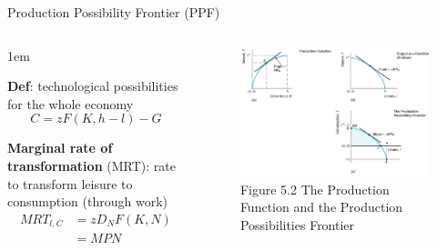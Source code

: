 \documentclass[11pt,aspectratio=43]{beamer}
\let\olditemize=\itemize
\let\endolditemize=\enditemize
\renewenvironment{itemize}{\olditemize \itemsep1em}{\endolditemize}
\theoremstyle{definition}
\begin{document}
\begin{frame}{Production Possibility Frontier (PPF)}
\label{slide:Production_Possibility_Frontier__PPF_}
\begin{columns}
    \begin{column}{0.5\textwidth}
        \begin{itemize}
            \item \textbf{Def}: technological possibilities for the whole economy
            \begin{equation}
            \label{eq:PPF}
                C = z F( K, h-l ) - G
            \end{equation}
            \item \textbf{Marginal rate of transformation} (MRT): rate to transform leisure to consumption (through work)
            \begin{equation}
            \label{eq:MRT}
                \begin{split}
                    MRT_{l, C}
                        & = z D_{N} F( K, N )
                    \\
                        & = MPN
                    \\
                \end{split}
            \end{equation}
        \end{itemize}
    \end{column}
    \begin{column}{0.5\textwidth}
        \begin{figure}
            \caption{\scriptsize Figure 5.2 The Production Function and the Production Possibilities Frontier}
            \includegraphics[width=\textwidth]{./figures/Figure5_2.jpg}
        \end{figure}
    \end{column}
\end{columns}
\end{frame}
\end{document}

